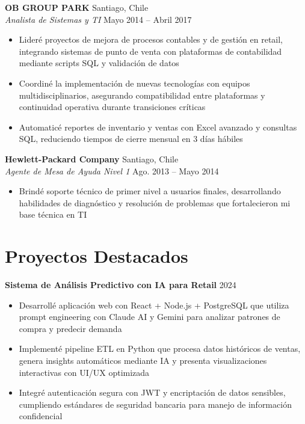 \documentclass[11pt,letterpaper]{article}
\begin{document}
\vspace{2pt}
\textbf{OB GROUP PARK} \hfill Santiago, Chile\\
\textit{Analista de Sistemas y TI} \hfill Mayo 2014 – Abril 2017
\begin{itemize}
  \item Lideré proyectos de mejora de procesos contables y de gestión en retail, integrando sistemas de punto de venta con plataformas de contabilidad mediante scripts SQL y validación de datos
  \item Coordiné la implementación de nuevas tecnologías con equipos multidisciplinarios, asegurando compatibilidad entre plataformas y continuidad operativa durante transiciones críticas
  \item Automaticé reportes de inventario y ventas con Excel avanzado y consultas SQL, reduciendo tiempos de cierre mensual en 3 días hábiles
\end{itemize}
\vspace{2pt}
\textbf{Hewlett-Packard Company} \hfill Santiago, Chile\\
\textit{Agente de Mesa de Ayuda Nivel 1} \hfill Ago. 2013 – Mayo 2014
\begin{itemize}
  \item Brindé soporte técnico de primer nivel a usuarios finales, desarrollando habilidades de diagnóstico y resolución de problemas que fortalecieron mi base técnica en TI
\end{itemize}

\section{Proyectos Destacados}

\textbf{Sistema de Análisis Predictivo con IA para Retail} \hfill 2024
\begin{itemize}
  \item Desarrollé aplicación web con React + Node.js + PostgreSQL que utiliza prompt engineering con Claude AI y Gemini para analizar patrones de compra y predecir demanda
  \item Implementé pipeline ETL en Python que procesa datos históricos de ventas, genera insights automáticos mediante IA y presenta visualizaciones interactivas con UI/UX optimizada
  \item Integré autenticación segura con JWT y encriptación de datos sensibles, cumpliendo estándares de seguridad bancaria para manejo de información confidencial
\end{itemize}
\end{document}

